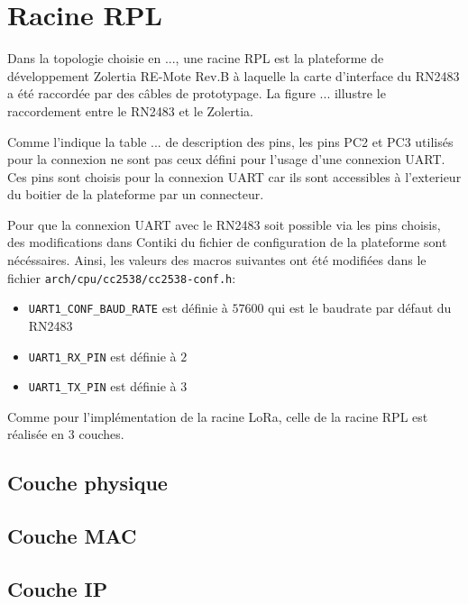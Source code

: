 \section{Racine RPL}\label{sec:work-rpl-root}
\renewcommand{\rightmark}{Racine RPL}

    Dans la topologie choisie en ..., une racine RPL est la plateforme de développement Zolertia RE-Mote Rev.B à laquelle la carte d'interface du RN2483 a été raccordée par des câbles de prototypage. La figure ... illustre le raccordement entre le RN2483 et le Zolertia.

    Comme l'indique la table ... de description des pins, les pins PC2 et PC3 utilisés pour la connexion ne sont pas ceux défini pour l'usage d'une connexion UART. Ces pins sont choisis pour la connexion UART car ils sont accessibles à l'exterieur du boitier de la plateforme par un connecteur.
    
    Pour que la connexion UART avec le RN2483 soit possible via les pins choisis, des modifications 
    dans Contiki du fichier de configuration de la plateforme sont nécéssaires.
    Ainsi, les valeurs des macros suivantes ont été modifiées dans le fichier \texttt{arch/cpu/cc2538/cc2538-conf.h}:
    \begin{itemize}
        \item \texttt{UART1\_CONF\_BAUD\_RATE} est définie à $57600$ qui est le baudrate par défaut du RN2483
        \item \texttt{UART1\_RX\_PIN} est définie à $2$
        \item \texttt{UART1\_TX\_PIN} est définie à $3$
    \end{itemize}

    Comme pour l'implémentation de la racine LoRa, celle de la racine RPL est réalisée en 3 couches.

\subsection*{Couche physique}
\subsection*{Couche MAC}
\subsection*{Couche IP}
